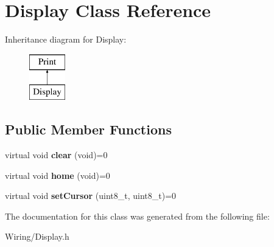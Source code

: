 \hypertarget{class_display}{}\section{Display Class Reference}
\label{class_display}
Inheritance diagram for Display\+:\begin{figure}[H]
\begin{center}
\leavevmode
\includegraphics[height=2.000000cm]{class_display}
\end{center}
\end{figure}
\subsection*{Public Member Functions}
\begin{DoxyCompactItemize}
\item 
\hypertarget{class_display_a0e3959fe9671746b0331e75f8d9f23e6}{}virtual void {\bfseries clear} (void)=0\label{class_display_a0e3959fe9671746b0331e75f8d9f23e6}

\item 
\hypertarget{class_display_a45f233e66569e797e6ad87c0338da56b}{}virtual void {\bfseries home} (void)=0\label{class_display_a45f233e66569e797e6ad87c0338da56b}

\item 
\hypertarget{class_display_ae782c76bdbef3b36574c327ebd1340b4}{}virtual void {\bfseries set\+Cursor} (uint8\+\_\+t, uint8\+\_\+t)=0\label{class_display_ae782c76bdbef3b36574c327ebd1340b4}

\end{DoxyCompactItemize}


The documentation for this class was generated from the following file\+:\begin{DoxyCompactItemize}
\item 
Wiring/Display.\+h\end{DoxyCompactItemize}
